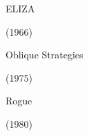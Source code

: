 \documentclass{beamer}
\begin{document}
\begin{frame}[c]
	\centering
	\Huge
	ELIZA
	
	(1966)
\end{frame}

\begin{frame}[plain]
\end{frame}

\begin{frame}[c]
	\centering
	\Huge
	Oblique Strategies
	
	(1975)
\end{frame}

\begin{frame}[plain]
\end{frame}

\begin{frame}[c]
	\centering
	\Huge
	Rogue
	
	(1980)
\end{frame}
\end{document}
